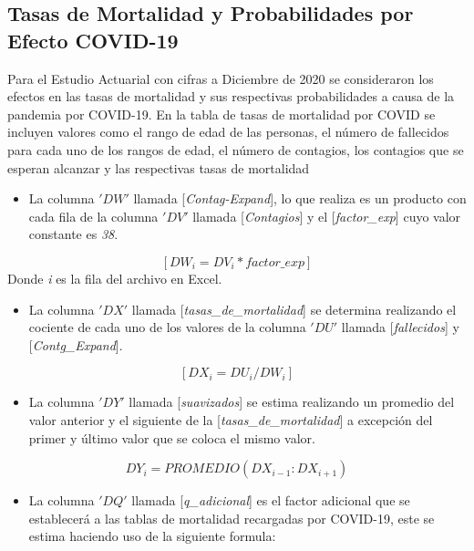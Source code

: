 \documentclass[
  letterpaper,
  DIV=11,
  numbers=noendperiod]{scrreprt}
\providecommand{\tightlist}{%
  \setlength{\itemsep}{0pt}\setlength{\parskip}{0pt}}\usepackage{longtable,booktabs,array}
\begin{document}
\hypertarget{tasas-de-mortalidad-y-probabilidades-por-efecto-covid-19}{%
\subsection{Tasas de Mortalidad y Probabilidades por Efecto
COVID-19}\label{tasas-de-mortalidad-y-probabilidades-por-efecto-covid-19}}

Para el Estudio Actuarial con cifras a Diciembre de 2020 se consideraron
los efectos en las tasas de mortalidad y sus respectivas probabilidades
a causa de la pandemia por COVID-19. En la tabla de tasas de mortalidad
por COVID se incluyen valores como el rango de edad de las personas, el
número de fallecidos para cada uno de los rangos de edad, el número de
contagios, los contagios que se esperan alcanzar y las respectivas tasas
de mortalidad

\begin{itemize}
\tightlist
\item
  La columna \('DW'\) llamada {[}\emph{Contag-Expand}{]}, lo que realiza
  es un producto con cada fila de la columna \('DV'\) llamada
  {[}\emph{Contagios}{]} y el {[}\emph{factor\_exp}{]} cuyo valor
  constante es \emph{38}.
\end{itemize}

\[[DW_i={DV}_i \ast factor\_exp]\] Donde \emph{i} es la fila del archivo
en Excel.

\begin{itemize}
\tightlist
\item
  La columna \('DX'\) llamada {[}\emph{tasas\_de\_mortalidad}{]} se
  determina realizando el cociente de cada uno de los valores de la
  columna \('DU'\) llamada {[}\emph{fallecidos}{]} y
  {[}\emph{Contg\_Expand}{]}.
\end{itemize}

\[[DX_i={DU}_i/{DW}_i]\]

\begin{itemize}
\tightlist
\item
  La columna \('DY'\) llamada {[}\emph{suavizados}{]} se estima
  realizando un promedio del valor anterior y el siguiente de la
  {[}\emph{tasas\_de\_mortalidad}{]} a excepción del primer y último
  valor que se coloca el mismo valor.
\end{itemize}

\[DY_i=PROMEDIO({DX}_{i-1}:{DX}_{i+1})\]

\begin{itemize}
\tightlist
\item
  La columna \('DQ'\) llamada {[}\emph{q\_adicional}{]} es el factor
  adicional que se establecerá a las tablas de mortalidad recargadas por
  COVID-19, este se estima haciendo uso de la siguiente formula:
\end{itemize}
\end{document}
